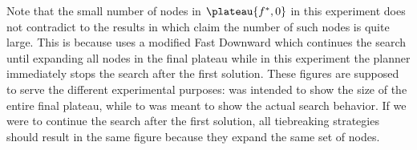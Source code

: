 Note that the small number of nodes in $\plateau{f^*,0}$ in this experiment does not contradict to the results in  which claim the number of such nodes is quite large.
This is because  uses a modified Fast Downward which continues the search until expanding all nodes in the final plateau while in this experiment the planner immediately stops the search after the first solution. These figures are supposed to serve the different experimental purposes:  was intended to show the size of the entire final plateau, while  to  was meant to show the actual search behavior. If we were to continue the search after the first solution, all tiebreaking strategies should result in the same figure because they expand the same set of nodes.


